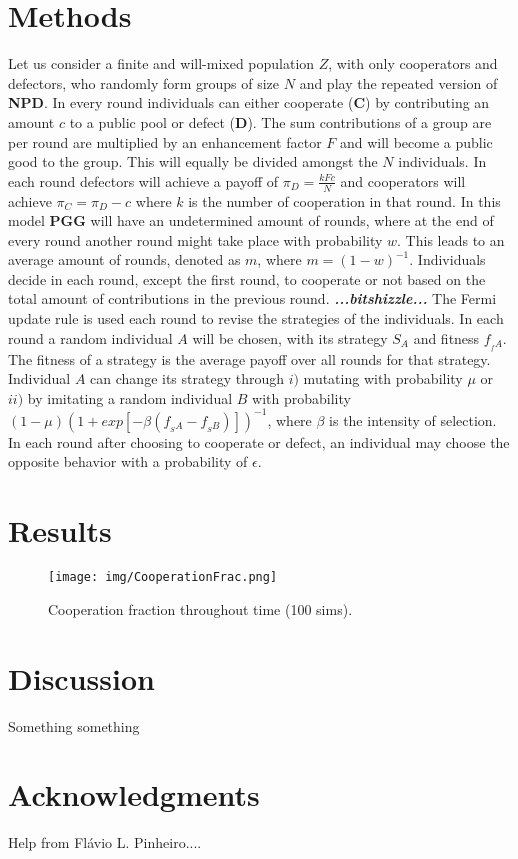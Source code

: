 \documentclass[letterpaper]{article}
\begin{document}
\section{Methods}
Let us consider a finite and will-mixed population $Z$, with only cooperators and defectors, who randomly form groups of size $N$ and play the repeated version of \textbf{NPD}. In every round individuals can either cooperate (\textbf{C}) by contributing an amount $c$ to a public pool or defect (\textbf{D}). The sum contributions of a group are per round are multiplied by an enhancement factor $F$ and will become a public good to the group. This will equally be divided amongst  the $N$ individuals. In each round defectors will achieve a payoff of $\pi_{D}= \frac{kFc}{N}$  and cooperators will achieve $\pi_{C}=\pi_{D}-c$ where $k$ is the number of cooperation in that round. In this model \textbf{PGG} will have an undetermined amount of rounds, where at the end of every round another round might take place with probability $w$. This leads to an average amount of rounds, denoted as $m$, where $m= (1-w)^{-1}$. Individuals decide in each round, except the first round, to cooperate or not based on the total amount of contributions in the previous round.
\textit{\textbf{...bitshizzle...}}
The Fermi update rule \citep{traulsen2006stochastic,grujic2014comparative} is used each round to revise the strategies of the individuals.
In each round a random individual $A$ will be chosen, with its strategy $S_{A}$ and fitness $f_{_f{A}}$. The fitness of a strategy is the average payoff over all rounds for that strategy. Individual $A$ can change its strategy through $i)$ mutating with probability $\mu$ or $ii)$ by imitating a random individual $B$ with probability $(1-\mu)(1+exp[-\beta(f_{_S{A}}-f_{_S{B}})])^{-1}$, where $\beta$ is the intensity of selection.
In each round after choosing to cooperate or defect, an individual may choose the opposite behavior with a probability of $\epsilon$.



\section{Results}


\begin{figure}[!htb]
\begin{center}
\texttt{[image: img/CooperationFrac.png]}
\caption{Cooperation fraction throughout time (100 sims).}
\label{fig1}
\end{center}
\end{figure}


\section{Discussion}
Something something

\section{Acknowledgments}

Help from Fl\'{a}vio L. Pinheiro....


\footnotesize


\end{document}
